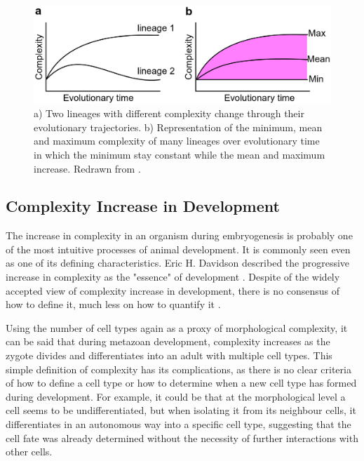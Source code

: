 \begin{figure}[t]
  \includegraphics[width=12cm]{./Images/complexity_min.jpeg}
  \centering
  \caption{a) Two lineages with different complexity change through their evolutionary trajectories.
  b) Representation of the minimum, mean and maximum complexity of many lineages over evolutionary time in which the minimum stay constant while the mean and maximum increase.
Redrawn from \citep{Arthur2010}.
 }
  \label{fig:Complexity_min}
\end{figure}

\subsection{Complexity Increase in Development}

The increase in complexity in an organism during embryogenesis is probably one of the most intuitive processes of animal development.
It is commonly seen even as one of its defining characteristics.
Eric H. Davidson described the progressive increase in complexity as the "essence" of development \citep{Davidson2001}. Despite of the widely accepted view of complexity increase in development, there is no consensus of how to define it, much less on how to quantify it \citep{susan2000ontogeny}.

Using the number of cell types again as a proxy of morphological complexity, it can be said that during metazoan development, complexity increases as the zygote divides and differentiates into an adult with multiple cell types. 
This simple definition of complexity has its complications, as there is no clear criteria of how to define a cell type or how to determine when a new cell type has formed during development. 
For example, it could be that at the morphological level a cell seems to be undifferentiated, but when isolating it from its neighbour cells, it differentiates in an autonomous way into a specific cell type, suggesting that the cell fate was already determined without the necessity of further interactions with other cells.

